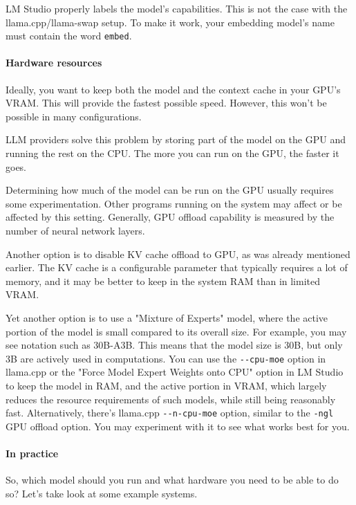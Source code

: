 \documentclass[hidelinks,titlepage,a4paper,twoside]{article}
\begin{document}
LM Studio properly labels the model's capabilities. This is not the case with the llama.cpp/llama-swap setup. To make it work, your embedding model's name must contain the word \texttt{embed}.

\paragraph{Hardware resources}

Ideally, you want to keep both the model and the context cache in your GPU's VRAM. This will provide the fastest possible speed. However, this won't be possible in many configurations.

LLM providers solve this problem by storing part of the model on the GPU and running the rest on the CPU. The more you can run on the GPU, the faster it goes.

Determining how much of the model can be run on the GPU usually requires some experimentation. Other programs running on the system may affect or be affected by this setting. Generally, GPU offload capability is measured by the number of neural network layers.

Another option is to disable KV cache offload to GPU, as was already mentioned earlier. The KV cache is a configurable parameter that typically requires a lot of memory, and it may be better to keep in the system RAM than in limited VRAM.

Yet another option is to use a "Mixture of Experts" model, where the active portion of the model is small compared to its overall size. For example, you may see notation such as 30B-A3B. This means that the model size is 30B, but only 3B are actively used in computations. You can use the \texttt{-{}-cpu-moe} option in llama.cpp or the "Force Model Expert Weights onto CPU" option in LM Studio to keep the model in RAM, and the active portion in VRAM, which largely reduces the resource requirements of such models, while still being reasonably fast. Alternatively, there's llama.cpp \texttt{-{}-n-cpu-moe} option, similar to the \texttt{-ngl} GPU offload option. You may experiment with it to see what works best for you.

\paragraph{In practice}

So, which model should you run and what hardware you need to be able to do so? Let's take look at some example systems.
\end{document}
